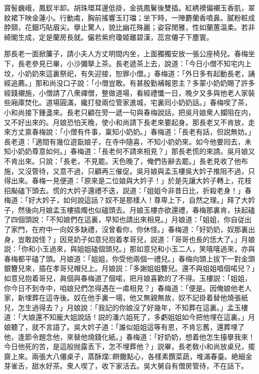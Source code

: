 \begin{myquote}
寳髻巍峨，鳳釵半卸。胡珠環耳邊低掛，金挑鳳鬢後雙插。紅綉襖偏襯玉香肌，翠紋裙下映金蓮小。行動䖏，胸前搖響玉玎璫；坐下時，一陣麝蘭香噴鼻。膩粉粧成脖頸，花鈿巧貼眉尖。擧止驚人，貌比幽花殊麗；姿容閒雅，性如蘭蕙温柔。若非綺閣生成，定是蘭房長就。儼若紫府瓊姬離碧漢，蕊宫僊子下塵寰。
\end{myquote}

那長老一面掀簾子，請小夫人方丈明間内坐，上面獨獨安放一張公座椅兒。春梅坐下，長老參見已畢，小沙彌拏上茶。長老遞茶上去，說道：「今日小僧不知宅内上坟，小奶奶來這裏祭祀，有失迎接，恕罪小僧。」春梅道：「外日多有起動長老，誦經追薦。」那和尚没口子說：「小僧豈敢。有甚殷勤補報恩主？多蒙小奶奶賜了許多經錢襯施，小僧請了八衆禪僧，整做道場，看經禮懺一日，晚夕又多與他老人家裝些廂庫焚化。道場圓滿，纔打發兩位管家進城，宅裏囘小奶奶話。」春梅喫了茶，小和尚接下鍾盞來。長老只顧在旁一遞一句與春梅說話，把吳月娘衆人攔阻在内，又不好出來的。月娘恐怕天晚，使小和尚請下長老來要起身。那長老又不肯放，走來方丈禀春梅說：「小僧有件事，稟知小奶奶。」春梅道：「長老有話，但説無妨。」長老道：「適間有幾位遊翫娘子，在寺中隨喜，不知小奶奶來。如今他要囘去，未知小奶奶尊意如何。」春梅道：「長老何不請來相見？」那長老慌的來請。吳月娘又不肯出來。只說：「長老，不見罷。天色晚了，俺們告辭去罷。」長老見收了他布施，又沒管待，又意不過，只顧再三催促。吳月娘與孟玉樓吳大妗子推阻不過，只得出來。春梅一見便道：「原來是二位娘與大妗子！」於是先讓大妗子轉上，花枝招颭磕下頭去。慌的大妗子還禮不迭，説道：「姐姐今非昔日比，折殺老身！」春梅道：「好大妗子，如何說這話？奴不是那樣人！尊卑上下，自然之理。」拜了大妗子，然後向月娘孟玉樓插燭也似磕頭去。月娘玉樓亦欲還禮，春梅那裏肯，扶起磕了四個頭說：「不知娘們在這裏，早知也請出來相見。」月娘道：「姐姐，你自従出了家門，在府中一向奴多缺禮，沒曾看你，你休怪。」春梅道：「好奶奶，奴那裏出身，豈敢說怪？」因見奶子如意兒抱着孝哥兒，説道：「哥哥也長的恁大了。」月娘説：「你和小玉過來，與姐姐磕個頭兒。」那如意兒和小玉二人，笑嘻嘻過來，亦與春梅都平磕了頭。月娘道：「姐姐，你受他兩個一禮兒。」春梅向頭上拔下一對金頭銀簪兒來，插在孝哥兒帽兒上。月娘説：「多謝姐姐簪兒。還不與姐姐唱個喏兒？」如意兒抱着哥兒，眞個與春梅道了個喏，把月娘喜歡的了不得。玉樓説：「姐姐，你今日不到寺中，咱娘兒們怎得遇在一䖏相見？」春梅道：「便是。因俺娘他老人家，新埋葬在這寺後。奴在他手裏一場，他又無親無故，奴不記掛着替他燒張紙兒，怎生過得去？」月娘說：「我記的你娘沒了好幾年，不知葬在這裏。」孟玉樓道：「大娘還不知龐大姐說話！説的潘六姐死了，多虧姐姐如今把他埋在這裏。」月娘聽了，就不言語了。吳大妗子道：「誰似姐姐這等有恩，不肯忘舊，還葬埋了他，逢節令題念他，來替他燒錢化紙。」春梅道：「好奶奶，想着他怎生擡擧我來！今日他死的苦，是這般抛露丢下，怎不埋葬他？」説畢，長老敎小和尚放桌兒，擺齋上來。兩張大八僊桌子，蒸酥煠□餅饊點心，各樣素饌菜蔬，堆滿春臺。絶細金芽雀舌，甜水好茶。衆人喫了，收下家活去。吳大舅自有僧房管待，不在話下。

